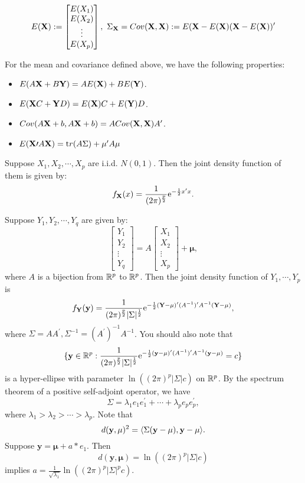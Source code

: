\documentclass[12pt]{book}
\begin{document}
\begin{definition} \ \\
$$
E(\mathbf{X}) := \begin{bmatrix}
	E(X_1) \\
	E(X_2) \\
	\vdots \\
	E(X_p)
\end{bmatrix}, \
\Sigma_{\mathbf{X}}=Cov(\mathbf{X},\mathbf{X}):=E(\mathbf{X}-E(\mathbf{X})(\mathbf{X}-E(\mathbf{X}))^\prime
$$	
\end{definition}

\begin{theorem}
For the mean and covariance defined above, we have the following properties:
\begin{itemize}
	\item $E(A\mathbf{X}+B\mathbf{Y})=AE(\mathbf{X})+BE(\mathbf{Y})$.
	\item $E(\mathbf{X} C +\mathbf{Y} D)=E(\mathbf{X})C+E(\mathbf{Y})D$.
	\item $Cov(A\mathbf{X}+b,A\mathbf{X}+b)=ACov(\mathbf{X},\mathbf{X})A^\prime$.
	\item $E(\mathbf{X}\prime A\mathbf{X})=\mathrm tr(A\Sigma)+\mu^\prime A \mu$
\end{itemize}
\end{theorem}

\begin{example}
Suppose $X_1,X_2,\cdots,X_p$ are i.i.d. $N(0,1)$. Then the joint density function of them is given by:
$$
f_{\mathbf{X}}(x)=\frac{1}{(2\pi)^{\frac{p}{2}}}\mathrm{e}^{-\frac{1}{2}x^\prime x}.
$$
\end{example}
Suppose $Y_1,Y_2,\cdots,Y_q$ are given by:
$$
\begin{bmatrix}
	Y_1 \\
	Y_2 \\
	\vdots \\
	Y_q
\end{bmatrix} = A
\begin{bmatrix}
	X_1 \\
	X_2 \\
	\vdots \\ 
	X_p
\end{bmatrix} + \mathbf{\mu},
$$
where $A$ is a bijection from $\mathbb{R}^p$ to $\mathbb{R}^p$. Then the joint density function of $Y_1,\cdots,Y_p$ is 
$$
f_{\mathbf{Y}}(\mathbf{y})= \frac{1}{(2\pi)^{\frac{p}{2}}|\Sigma|^{\frac{1}{2}}}\mathrm{e}^{-\frac{1}{2}(\mathbf{Y}-\mathbf{\mu})^\prime (A^{-1})^{\prime}A^{-1}(\mathbf{Y}-\mathbf{\mu})},
$$
where $\Sigma=AA^\prime,\Sigma^{-1}=(A^{\prime})^{-1}A^{-1}$. You should also note that 
$$
\{\mathbf y \in \mathbb{R}^p:\frac{1}{(2\pi)^{\frac{p}{2}}|\Sigma|^{\frac{1}{2}}}\mathrm{e}^{-\frac{1}{2}(\mathbf y-\mathbf{\mu})^\prime (A^{-1})^{\prime}A^{-1}(\mathbf y-\mathbf{\mu})} = c \}
$$
is a hyper-ellipse with parameter $\ln ((2\pi)^p|\Sigma|c)$ on $\mathbb{R}^p$. By the spectrum theorem of a positive self-adjoint operator, we have
$$
\Sigma = \lambda_1 e_1 e_1^\prime + \cdots +\lambda_p e_p e_p^\prime,
$$
where $\lambda_1 > \lambda_2 > \cdots > \lambda_p$. Note that 
$$
d(\mathbf y,\mathbf \mu)^2 = {\langle \Sigma(\mathbf y-\mathbf \mu),\mathbf y-\mathbf \mu\rangle}.
$$
Suppose $\mathbf y = \mathbf \mu + a*e_1$. Then
$$
d(\mathbf y,\mathbf \mu)  = \ln ((2\pi)^p|\Sigma|c)
$$
implies $a = \frac{1}{\sqrt{\lambda_1}} \ln ((2\pi)^p|\Sigma|^pc)$.
\end{document}
